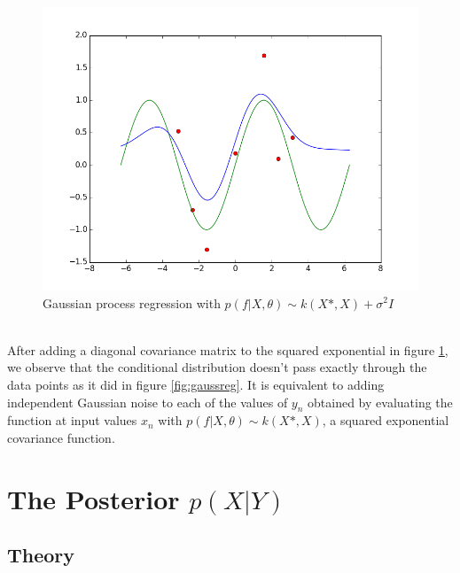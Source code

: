 \documentclass[a4paper,11pt]{article}
\theoremstyle{mytheor}
\begin{document}
\begin{figure}[h]
\centering
\includegraphics[scale = 0.6]{diagonal}
\caption{Gaussian process regression with $p(f|X,\theta) \sim k(X*,X)+\sigma^2I$}
\label{diagonal}
\end{figure}
\\After adding a diagonal covariance matrix to the squared exponential in figure \ref{diagonal}, we observe that the conditional distribution doesn't pass exactly through the data points as it did in figure \ref{fig:gaussreg}. It is equivalent to adding independent Gaussian noise to each of the 
values of $y_n$ obtained by
evaluating the function at input
values $x_n$ with $p(f|X,\theta) \sim k(X*,X)$, a squared exponential covariance function.

\section{The Posterior $p(X|Y)$}

\subsection{Theory}
\end{document}
